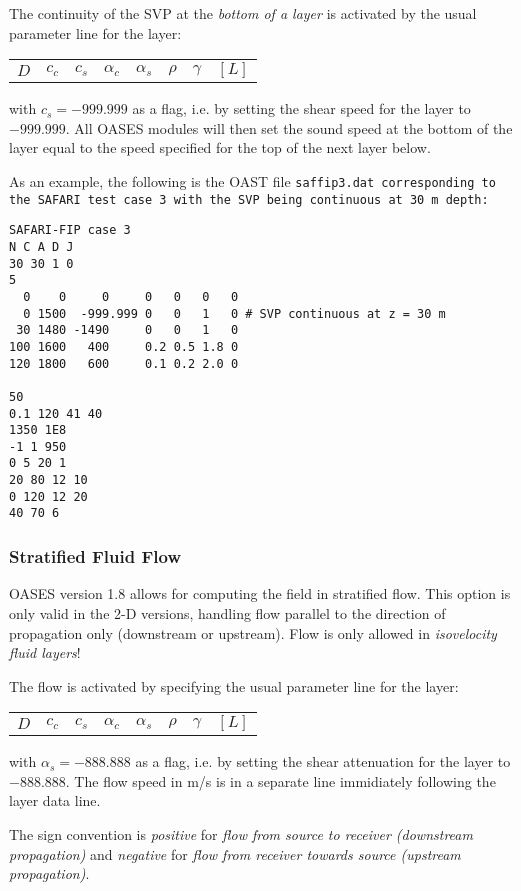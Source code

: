 The continuity of the SVP at the {\em bottom of a layer} is activated by the
usual parameter line for the layer:

\begin{tabular}{cccccccc}
    $D$ &    $c_c$ & $c_s$ & $\alpha_c$ & $\alpha_s$ &  $\rho$ &
$\gamma$ & $ [L] $
\end{tabular}

\noindent with $c_s =-999.999 $  as  a  flag, i.e. by setting the shear
speed for the layer to $ -999.999 $. All OASES modules will then set
the sound speed at the bottom of the layer equal to the speed
specified for the top of the next layer below.

As an example, the following is the OAST file \tt saffip3.dat \rm
corresponding to the SAFARI test case 3 with the SVP being continuous
at 30 m depth:

\begin{verbatim}
SAFARI-FIP case 3
N C A D J
30 30 1 0
5
  0    0     0     0   0   0   0
  0 1500  -999.999 0   0   1   0 # SVP continuous at z = 30 m
 30 1480 -1490     0   0   1   0
100 1600   400     0.2 0.5 1.8 0
120 1800   600     0.1 0.2 2.0 0

50
0.1 120 41 40
1350 1E8
-1 1 950
0 5 20 1
20 80 12 10
0 120 12 20
40 70 6
\end{verbatim}

\subsubsection{Stratified Fluid Flow}

OASES version 1.8 allows for computing the field in stratified flow. This
option is only valid in the 2-D versions, handling flow parallel to
the direction of propagation only (downstream or upstream). Flow is
only allowed in {\em isovelocity fluid layers}!

The flow is activated by  specifying  the
usual parameter line for the layer:

\begin{tabular}{cccccccc}
    $D$ &    $c_c$ & $c_s$ & $\alpha_c$ & $\alpha_s$ &  $\rho$ &
$\gamma$ & $ [L] $
\end{tabular}

\noindent with $\alpha_s =-888.888 $  as  a  flag, i.e. by setting the shear
attenuation for the layer to $ -888.888 $. The
flow speed in m/s is in a separate line immidiately following the layer
data line.

The sign convention is {\em positive} for {\em flow from
source to receiver (downstream propagation)} and {\em negative} for
{\em flow from receiver towards source (upstream propagation)}.

